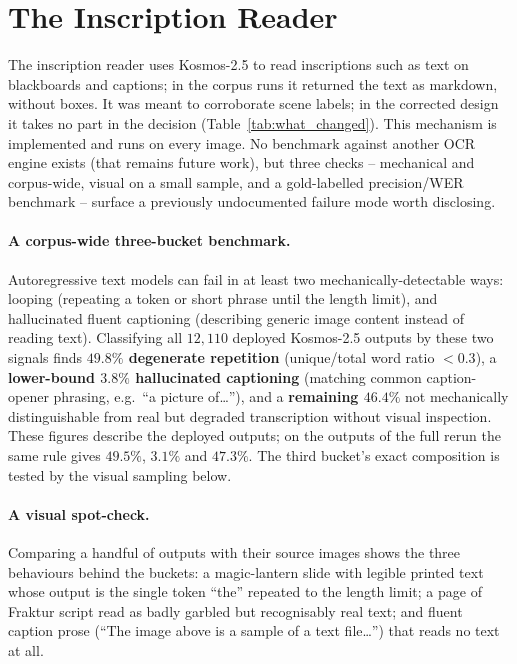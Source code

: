 \documentclass[12pt,a4paper]{report}
\begin{document}
\section{The Inscription Reader}
\label{sec:agent5_ocr}
The inscription reader uses Kosmos-2.5 to read inscriptions such as text on blackboards and captions; in the corpus runs it returned the text as markdown, without boxes. It was meant to corroborate scene labels; in the corrected design it takes no part in the decision (Table~\ref{tab:what_changed}). This mechanism is implemented and runs on every image. No benchmark against another OCR engine exists (that remains future work), but three checks -- mechanical and corpus-wide, visual on a small sample, and a gold-labelled precision/WER benchmark -- surface a previously undocumented failure mode worth disclosing.

\paragraph{A corpus-wide three-bucket benchmark.} Autoregressive text models can fail in at least two mechanically-detectable ways: looping (repeating a token or short phrase until the length limit), and hallucinated fluent captioning (describing generic image content instead of reading text). Classifying all $12{,}110$ deployed Kosmos-2.5 outputs by these two signals finds \textbf{$49.8\%$ degenerate repetition} (unique/total word ratio $<0.3$), a \textbf{lower-bound $3.8\%$ hallucinated captioning} (matching common caption-opener phrasing, e.g.\ ``a picture of\ldots''), and a \textbf{remaining $46.4\%$} not mechanically distinguishable from real but degraded transcription without visual inspection. These figures describe the deployed outputs; on the outputs of the full rerun the same rule gives $49.5\%$, $3.1\%$ and $47.3\%$. The third bucket's exact composition is tested by the visual sampling below.

\paragraph{A visual spot-check.} Comparing a handful of outputs with their source images shows the three behaviours behind the buckets: a magic-lantern slide with legible printed text whose output is the single token ``the'' repeated to the length limit; a page of Fraktur script read as badly garbled but recognisably real text; and fluent caption prose (``The image above is a sample of a text file\ldots'') that reads no text at all.
\end{document}

